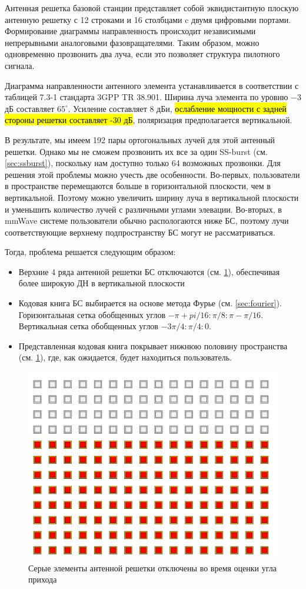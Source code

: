 Антенная решетка базовой станции представляет собой эквидистантную плоскую
антенную решетку с 12 строками и 16 столбцами c двумя цифровыми портами.
Формирование диаграммы направленность происходит независимыми непрерывными
аналоговыми фазовращателями. Таким образом, можно одновременно прозвонить два
луча, если это позволяет структура пилотного сигнала.

Диаграмма направленности антенного элемента устанавливается в соответствии с
таблицей 7.3-1 стандарта 3GPP TR 38.901. Ширина луча элемента по уровню $-3$ дБ
составляет $65^\circ$. Усиление составляет 8 дБи, \hl{ослабление мощности с задней
стороны решетки составляет -30 дБ}, поляризация предполагается вертикальной.

В результате, мы имеем 192 пары ортогональных лучей для этой антенный решетки.
Однако мы не сможем прозвонить их все за один SS-burst (см. \ref{sec:ssburst}),
поскольку нам доступно только 64 возможных прозвонки. Для решения этой проблемы
можно учесть две особенности.  Во-первых, пользователи в пространстве перемещаются больше в
горизонтальной плоскости, чем в вертикальной. Поэтому можно увеличить ширину
луча в вертикальной плоскости и уменьшить количество лучей с различными углами
элевации.  Во-вторых, в mmWave системе пользователи обычно распологаются ниже
БС, поэтому лучи соответствующие верхнему подпространству БС могут не
рассматриваться.

Тогда, проблема решается следующим образом:
\begin{itemize}
    \item Верхние 4 ряда антенной решетки БС отключаются (см. \ref{fig:4.6}), обеспечивая более широкую ДН в вертикальной плоскости
    \item Кодовая книга БС выбирается на основе метода Фурье (см.
    \ref{sec:fourier}). Горизонтальная сетка обобщенных углов $-\pi +
    pi/16:\pi/8:\pi-\pi/16$.
          Вертикальная сетка обобщенных углов $-3\pi/4:\pi/4:0$.
    \item Представленная кодовая книга покрывает нижнюю половину пространства (см. \ref{fig:4.6}), где, как ожидается, будет находиться пользователь.
\end{itemize}

\begin{figure}[ht]
    \centering
    \includegraphics[width=0.35\linewidth]{figs/fig4.5.png}
    \caption{Серые элементы антенной решетки отключены во время оценки угла прихода}
    \label{fig:4.6}
\end{figure}

